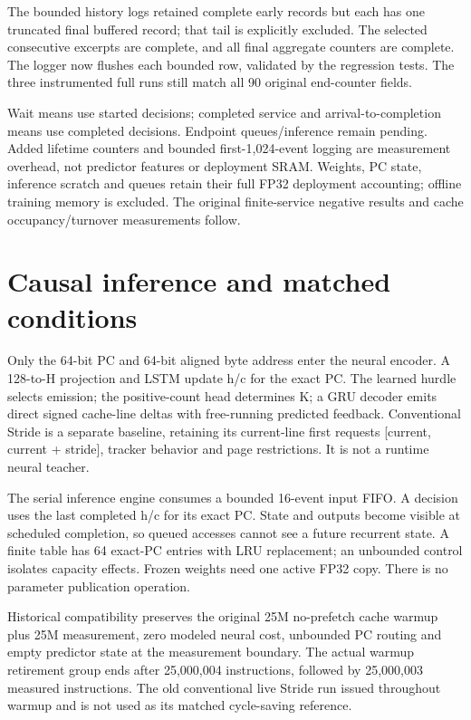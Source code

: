 \documentclass[10pt]{article}
\begin{document}
The bounded history logs retained complete early records but each has one truncated final buffered record; that tail is explicitly excluded. The selected consecutive excerpts are complete, and all final aggregate counters are complete. The logger now flushes each bounded row, validated by the regression tests. The three instrumented full runs still match all 90 original end-counter fields.

Wait means use started decisions; completed service and arrival-to-completion means use completed decisions. Endpoint queues/inference remain pending. Added lifetime counters and bounded first-1,024-event logging are measurement overhead, not predictor features or deployment SRAM. Weights, PC state, inference scratch and queues retain their full FP32 deployment accounting; offline training memory is excluded. The original finite-service negative results and cache occupancy/turnover measurements follow.

\clearpage\section{Causal inference and matched conditions}

Only the 64-bit PC and 64-bit aligned byte address enter the neural encoder. A 128-to-H projection and LSTM update h/c for the exact PC. The learned hurdle selects emission; the positive-count head determines K; a GRU decoder emits direct signed cache-line deltas with free-running predicted feedback. Conventional Stride is a separate baseline, retaining its current-line first requests [current, current + stride], tracker behavior and page restrictions. It is not a runtime neural teacher.

The serial inference engine consumes a bounded 16-event input FIFO. A decision uses the last completed h/c for its exact PC. State and outputs become visible at scheduled completion, so queued accesses cannot see a future recurrent state. A finite table has 64 exact-PC entries with LRU replacement; an unbounded control isolates capacity effects. Frozen weights need one active FP32 copy. There is no parameter publication operation.

Historical compatibility preserves the original 25M no-prefetch cache warmup plus 25M measurement, zero modeled neural cost, unbounded PC routing and empty predictor state at the measurement boundary. The actual warmup retirement group ends after 25,000,004 instructions, followed by 25,000,003 measured instructions. The old conventional live Stride run issued throughout warmup and is not used as its matched cycle-saving reference.
\end{document}

